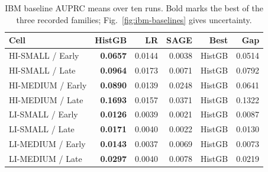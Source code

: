 \begin{table}[t]
\caption{IBM baseline AUPRC means over ten runs. Bold marks the best of the three recorded families; Fig.~\ref{fig:ibm-baselines} gives uncertainty.}
\label{tab:ibm-baselines}
\centering
\footnotesize
\setlength{\tabcolsep}{2.6pt}
\begin{tabular}{@{}lrrrrr@{}}
\toprule
Cell & HistGB & LR & SAGE & Best & Gap \\
\midrule
HI-SMALL / Early & \textbf{0.0657} & 0.0144 & 0.0038 & HistGB & 0.0514 \\
HI-SMALL / Late & \textbf{0.0964} & 0.0173 & 0.0071 & HistGB & 0.0792 \\
HI-MEDIUM / Early & \textbf{0.0890} & 0.0139 & 0.0248 & HistGB & 0.0641 \\
HI-MEDIUM / Late & \textbf{0.1693} & 0.0157 & 0.0371 & HistGB & 0.1322 \\
LI-SMALL / Early & \textbf{0.0126} & 0.0039 & 0.0021 & HistGB & 0.0087 \\
LI-SMALL / Late & \textbf{0.0171} & 0.0040 & 0.0022 & HistGB & 0.0130 \\
LI-MEDIUM / Early & \textbf{0.0143} & 0.0037 & 0.0069 & HistGB & 0.0073 \\
LI-MEDIUM / Late & \textbf{0.0297} & 0.0040 & 0.0078 & HistGB & 0.0219 \\
\bottomrule
\end{tabular}
\end{table}
